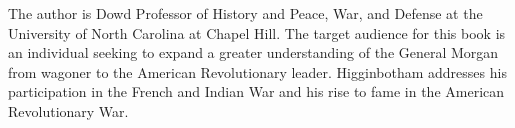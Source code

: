 The author is Dowd Professor of History and Peace, War, and Defense at
the University of North Carolina at Chapel Hill. The target audience for this
book is an individual seeking to expand a greater understanding of the General
Morgan from wagoner to the American Revolutionary leader. Higginbotham
addresses his participation in the French and Indian War and his rise to fame
in the American Revolutionary War.
